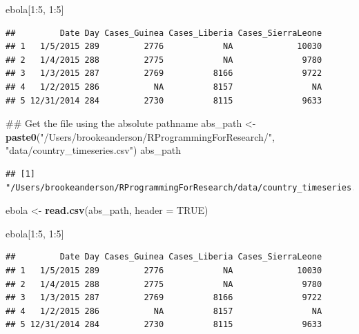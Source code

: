 \documentclass[]{book}
\makeatletter
\newenvironment{Shaded}{\begin{snugshade}}{\end{snugshade}}
\newcommand{\KeywordTok}[1]{\textcolor[rgb]{0.13,0.29,0.53}{\textbf{{#1}}}}
\newcommand{\DataTypeTok}[1]{\textcolor[rgb]{0.13,0.29,0.53}{{#1}}}
\newcommand{\DecValTok}[1]{\textcolor[rgb]{0.00,0.00,0.81}{{#1}}}
\newcommand{\StringTok}[1]{\textcolor[rgb]{0.31,0.60,0.02}{{#1}}}
\newcommand{\OtherTok}[1]{\textcolor[rgb]{0.56,0.35,0.01}{{#1}}}
\newcommand{\NormalTok}[1]{{#1}}
\newenvironment{kframe}{%
\medskip{}
\setlength{\fboxsep}{.8em}
 \def\at@end@of@kframe{}%
 \ifinner\ifhmode%
  \def\at@end@of@kframe{\end{minipage}}%
  \begin{minipage}{\columnwidth}%
 \fi\fi%
 \def\FrameCommand##1{\hskip\@totalleftmargin \hskip-\fboxsep
 \colorbox{shadecolor}{##1}\hskip-\fboxsep
     \hskip-\linewidth \hskip-\@totalleftmargin \hskip\columnwidth}%
 \MakeFramed {\advance\hsize-\width
   \@totalleftmargin\z@ \linewidth\hsize
   \@setminipage}}%
 {\par\unskip\endMakeFramed%
 \at@end@of@kframe}
\renewenvironment{Shaded}{\begin{kframe}}{\end{kframe}}
\makeatother
\begin{document}
\begin{Shaded}
\begin{Highlighting}[]
\NormalTok{ebola[}\DecValTok{1}\NormalTok{:}\DecValTok{5}\NormalTok{, }\DecValTok{1}\NormalTok{:}\DecValTok{5}\NormalTok{]}
\end{Highlighting}
\end{Shaded}

\begin{verbatim}
##         Date Day Cases_Guinea Cases_Liberia Cases_SierraLeone
## 1   1/5/2015 289         2776            NA             10030
## 2   1/4/2015 288         2775            NA              9780
## 3   1/3/2015 287         2769          8166              9722
## 4   1/2/2015 286           NA          8157                NA
## 5 12/31/2014 284         2730          8115              9633
\end{verbatim}

\begin{Shaded}
\begin{Highlighting}[]
\NormalTok{## Get the file using the absolute pathname}
\NormalTok{abs_path <-}\StringTok{ }\KeywordTok{paste0}\NormalTok{(}\StringTok{"/Users/brookeanderson/RProgrammingForResearch/"}\NormalTok{,}
                   \StringTok{"data/country_timeseries.csv"}\NormalTok{)}
\NormalTok{abs_path}
\end{Highlighting}
\end{Shaded}

\begin{verbatim}
## [1] "/Users/brookeanderson/RProgrammingForResearch/data/country_timeseries.csv"
\end{verbatim}

\begin{Shaded}
\begin{Highlighting}[]
\NormalTok{ebola <-}\StringTok{ }\KeywordTok{read.csv}\NormalTok{(abs_path, }\DataTypeTok{header =} \OtherTok{TRUE}\NormalTok{) }
\end{Highlighting}
\end{Shaded}

\begin{Shaded}
\begin{Highlighting}[]
\NormalTok{ebola[}\DecValTok{1}\NormalTok{:}\DecValTok{5}\NormalTok{, }\DecValTok{1}\NormalTok{:}\DecValTok{5}\NormalTok{]}
\end{Highlighting}
\end{Shaded}

\begin{verbatim}
##         Date Day Cases_Guinea Cases_Liberia Cases_SierraLeone
## 1   1/5/2015 289         2776            NA             10030
## 2   1/4/2015 288         2775            NA              9780
## 3   1/3/2015 287         2769          8166              9722
## 4   1/2/2015 286           NA          8157                NA
## 5 12/31/2014 284         2730          8115              9633
\end{verbatim}
\end{document}
